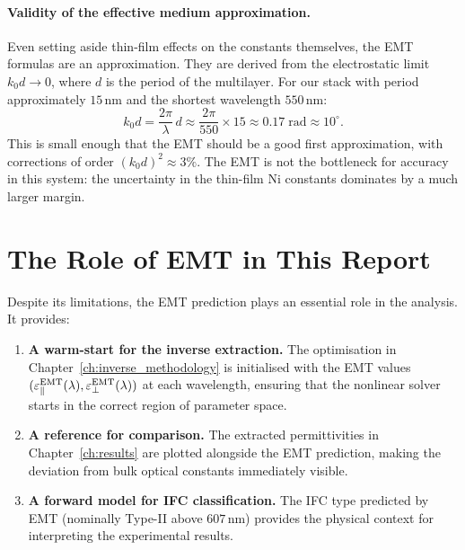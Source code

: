 \paragraph{Validity of the effective medium approximation.}
Even setting aside thin-film effects on the constants themselves, the EMT
formulas are an approximation. They are derived from the electrostatic
limit $k_0 d \to 0$, where $d$ is the period of the multilayer. For our
stack with period approximately $15$\,nm and the shortest wavelength $550$\,nm:
\begin{equation}
  k_0 d = \frac{2\pi}{\lambda}\,d \approx \frac{2\pi}{550}\times 15
  \approx 0.17\;\text{rad} \approx 10^\circ.
  \label{eq:ch3_kd}
\end{equation}
This is small enough that the EMT should be a good first approximation, with
corrections of order $(k_0 d)^2 \approx 3\%$. The EMT is not the bottleneck
for accuracy in this system: the uncertainty in the thin-film Ni constants
dominates by a much larger margin.

\section{The Role of EMT in This Report}

Despite its limitations, the EMT prediction plays an essential role in the
analysis. It provides:

\begin{enumerate}
\item \textbf{A warm-start for the inverse extraction.} The
  optimisation in Chapter~\ref{ch:inverse_methodology} is initialised with
  the EMT values $(\varepsilon_{\parallel}^\text{EMT}(\lambda), \varepsilon_{\perp}^\text{EMT}(\lambda))$
  at each wavelength, ensuring that the nonlinear solver starts in the correct
  region of parameter space.

\item \textbf{A reference for comparison.} The extracted permittivities in
  Chapter~\ref{ch:results} are plotted alongside the EMT prediction, making
  the deviation from bulk optical constants immediately visible.

\item \textbf{A forward model for IFC classification.} The IFC type
  predicted by EMT (nominally Type-II above $607$\,nm) provides the physical
  context for interpreting the experimental results.
\end{enumerate}

